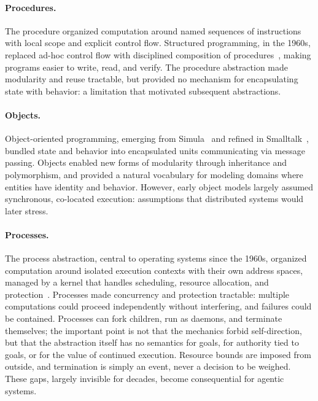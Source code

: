 \documentclass[11pt]{article}
\begin{document}
\paragraph{Procedures.}
The procedure organized computation around named sequences of instructions with local scope and explicit control flow. Structured programming, in the 1960s, replaced ad-hoc control flow with disciplined composition of procedures~\cite{dijkstra_structured}, making programs easier to write, read, and verify. The procedure abstraction made modularity and reuse tractable, but provided no mechanism for encapsulating state with behavior: a limitation that motivated subsequent abstractions.

\paragraph{Objects.}
Object-oriented programming, emerging from Simula~\cite{dahl_simula} and refined in Smalltalk~\cite{kay_smalltalk}, bundled state and behavior into encapsulated units communicating via message passing. Objects enabled new forms of modularity through inheritance and polymorphism, and provided a natural vocabulary for modeling domains where entities have identity and behavior. However, early object models largely assumed synchronous, co-located execution: assumptions that distributed systems would later stress.

\paragraph{Processes.}
The process abstraction, central to operating systems since the 1960s, organized computation around isolated execution contexts with their own address spaces, managed by a kernel that handles scheduling, resource allocation, and protection~\cite{dijkstra_the}. Processes made concurrency and protection tractable: multiple computations could proceed independently without interfering, and failures could be contained. Processes can fork children, run as daemons, and terminate themselves; the important point is not that the mechanics forbid self-direction, but that the abstraction itself has no semantics for goals, for authority tied to goals, or for the value of continued execution. Resource bounds are imposed from outside, and termination is simply an event, never a decision to be weighed. These gaps, largely invisible for decades, become consequential for agentic systems.
\end{document}
